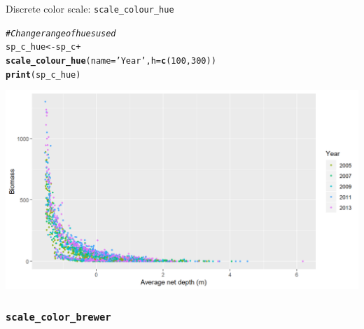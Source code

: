 \documentclass{beamer}\usepackage[]{graphicx}\usepackage[]{color}
\makeatletter
\newcommand{\hlnum}[1]{\textcolor[rgb]{0.686,0.059,0.569}{#1}}%
\newcommand{\hlstr}[1]{\textcolor[rgb]{0.192,0.494,0.8}{#1}}%
\newcommand{\hlcom}[1]{\textcolor[rgb]{0.678,0.584,0.686}{\textit{#1}}}%
\newcommand{\hlopt}[1]{\textcolor[rgb]{0,0,0}{#1}}%
\newcommand{\hlstd}[1]{\textcolor[rgb]{0.345,0.345,0.345}{#1}}%
\newcommand{\hlkwb}[1]{\textcolor[rgb]{0.69,0.353,0.396}{#1}}%
\newcommand{\hlkwc}[1]{\textcolor[rgb]{0.333,0.667,0.333}{#1}}%
\newcommand{\hlkwd}[1]{\textcolor[rgb]{0.737,0.353,0.396}{\textbf{#1}}}%
\newenvironment{kframe}{%
 \def\at@end@of@kframe{}%
 \ifinner\ifhmode%
  \def\at@end@of@kframe{\end{minipage}}%
  \begin{minipage}{\columnwidth}%
 \fi\fi%
 \def\FrameCommand##1{\hskip\@totalleftmargin \hskip-\fboxsep
 \colorbox{shadecolor}{##1}\hskip-\fboxsep
     \hskip-\linewidth \hskip-\@totalleftmargin \hskip\columnwidth}%
 \MakeFramed {\advance\hsize-\width
   \@totalleftmargin\z@ \linewidth\hsize
   \@setminipage}}%
 {\par\unskip\endMakeFramed%
 \at@end@of@kframe}
\newenvironment{knitrout}{}{} %
\makeatother
\begin{document}
\begin{frame}[fragile]{Discrete color scale: \lstinline{scale_colour_hue}}
\begin{knitrout}\footnotesize
{}\color{fgcolor}\begin{kframe}
\begin{alltt}
\hlcom{# Change range of hues used}
\hlstd{sp_c_hue} \hlkwb{<-} \hlstd{sp_c} \hlopt{+}
  \hlkwd{scale_colour_hue}\hlstd{(}\hlkwc{name}\hlstd{=}\hlstr{'Year'}\hlstd{,} \hlkwc{h}\hlstd{=}\hlkwd{c}\hlstd{(}\hlnum{100}\hlstd{,} \hlnum{300}\hlstd{))}
\hlkwd{print}\hlstd{(sp_c_hue)}
\end{alltt}
\end{kframe}

{\centering \includegraphics[width=.9\linewidth]{figure/sp_discrete_color_hue3b-1} 

}



\end{knitrout}
\end{frame}

\subsubsection{\lstinline{scale_color_brewer}}
\end{document}
